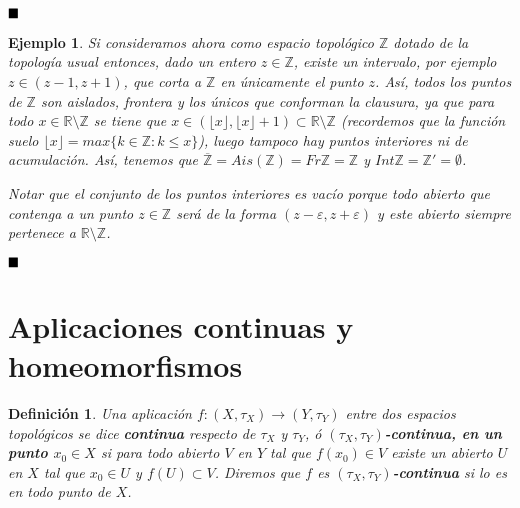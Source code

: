 \documentclass[12pt]{article}
\newtheorem{definition}[theorem]{Definición}
\newtheorem{example}{Ejemplo}[theorem]
\begin{document}
$\hfill \blacksquare$

\begin{example}Si consideramos ahora como espacio topológico $\mathbb{Z}$ dotado de la topología usual entonces, dado un entero $z \in \mathbb{Z}$, existe un intervalo, por ejemplo $z \in (z-1, z+1)$, que corta a $\mathbb{Z}$ en únicamente el punto $z$. Así, todos los puntos de $\mathbb{Z}$ son aislados, frontera y los únicos que conforman la clausura, ya que para todo $x \in \mathbb{R}\setminus \mathbb{Z}$ se tiene que $x \in (\lfloor x \rfloor, \lfloor x \rfloor + 1) \subset \mathbb{R} \setminus \mathbb{Z}$ (recordemos que la función suelo $\lfloor x \rfloor = max\lbrace k \in \mathbb{Z}: k\leq x \rbrace$), luego tampoco hay puntos interiores ni de acumulación. Así, tenemos que $\overline{\mathbb{Z}} = Ais (\mathbb{Z}) = Fr\mathbb{Z} = \mathbb{Z}$ y $Int\mathbb{Z} = \mathbb{Z}' = \emptyset$.

Notar que el conjunto de los puntos interiores es vacío porque todo abierto que contenga a un punto $z \in \mathbb{Z}$ será de la forma $(z-\varepsilon, z+\varepsilon)$ y este abierto siempre pertenece a $\mathbb{R}\setminus \mathbb{Z}$.
\end{example}

$\hfill \blacksquare$

\section{Aplicaciones continuas y homeomorfismos}

\begin{definition}Una aplicación $f \colon (X, \tau_X) \longrightarrow (Y, \tau_Y)$ entre dos espacios topológicos se dice \textbf{continua} respecto de $\tau_X$ y $\tau_Y$, ó \textbf{$(\tau_X, \tau_Y)$-continua, en un punto $x_0 \in X$} si para todo abierto $V$ en $Y$ tal que $f(x_0) \in V$ existe un abierto $U$ en $X$ tal que $x_0 \in U$ y $f(U) \subset V$. Diremos que $f$ es \textbf{$(\tau_X, \tau_Y)$-continua} si lo es en todo punto de $X$.
\end{definition}
\begin{center}
\end{center}
\end{document}
